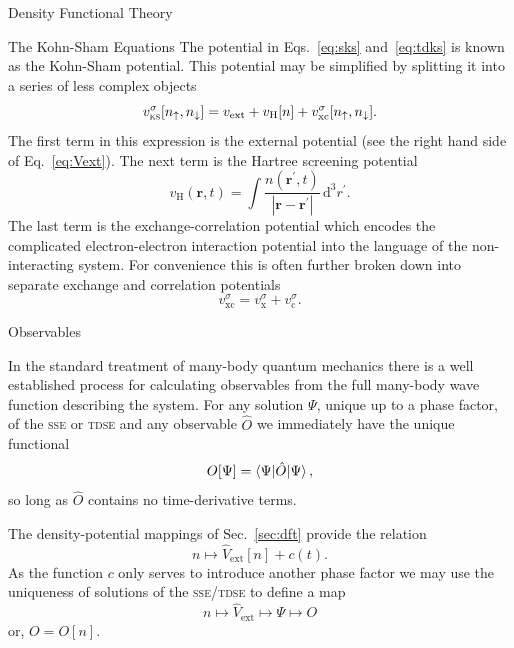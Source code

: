 \documentclass[letterpaper, 11 pt]{report}
\begin{document}
\begin{chapter}{Density Functional Theory \label{chap:dft}}
\begin{section}{The Kohn-Sham Equations \label{sec:ks}}
      The potential in Eqs.~\eqref{eq:sks} and~\eqref{eq:tdks} is known as the Kohn-Sham potential. This
      potential may be simplified by splitting it into a series of less complex objects
      \begin{equation} \label{eq:vks}
         v^\sigma_\mathrm{\textsc{ks}}[n_\uparrow, n_\downarrow] = v_\mathrm{ext} + v_\mathrm{H}[n]
            + v^\sigma_\mathrm{xc}[n_\uparrow, n_\downarrow].
      \end{equation}
      The first term in this expression is the external potential (see the right hand side of
      Eq.~\ref{eq:Vext}). The next term is the Hartree screening potential
      \begin{equation} \label{eq:vh}
         v_\mathrm{H}(\mathbf{r},t) = \int \frac{n(\mathbf{r}^\prime, t)}
            {\left| \mathbf{r} - \mathbf{r}^\prime\right|} \, \mathrm{d}^3 r^\prime.
      \end{equation}
      The last term is the exchange-correlation potential which encodes the complicated
      electron-electron interaction potential into the language of the non-interacting system. For
      convenience this is often further broken down into separate exchange and correlation potentials
      \begin{equation} \label{eq:vxc}
         v^\sigma_\mathrm{xc} = v^\sigma_\mathrm{x} + v^\sigma_\mathrm{c}.
      \end{equation}

   \end{section}

   \begin{section}{Observables \label{sec:obs}}

      In the standard treatment of many-body quantum mechanics there is a well established process for
      calculating observables from the full many-body wave function describing the system. For any
      solution $\Psi$, unique up to a phase factor, of the \textsc{sse} or \textsc{tdse} and any
      observable $\hat{O}$ we immediately have the unique functional
      \begin{equation} \label{eq:obsfunc1}
         O[\Psi] = \braket{\Psi| \hat{O} | \Psi},
      \end{equation}
      so long as $\hat{O}$ contains no time-derivative terms.

      The density-potential mappings of Sec.~\ref{sec:dft} provide the relation
      \begin{equation} \label{eq:denpot}
         n \mapsto \hat{V}_\mathrm{ext}[n] + c(t).
      \end{equation}
      As the function $c$ only serves to introduce another phase factor we may use the uniqueness of
      solutions of the \textsc{sse}/\textsc{tdse} to define a map
      \begin{equation} \label{eq:obsfunc2}
         n \mapsto \hat{V}_\mathrm{ext} \mapsto \Psi \mapsto O
      \end{equation}
      or, $O = O[n]$.


\end{section}
\end{chapter}
\end{document}

